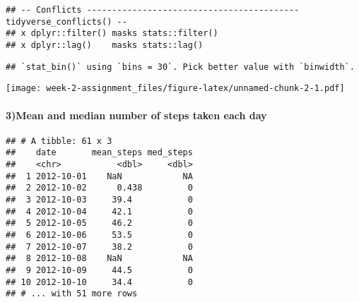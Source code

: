\documentclass[]{article}
\newenvironment{Shaded}{\begin{snugshade}}{\end{snugshade}}
\newcommand{\KeywordTok}[1]{\textcolor[rgb]{0.13,0.29,0.53}{\textbf{#1}}}
\newcommand{\DataTypeTok}[1]{\textcolor[rgb]{0.13,0.29,0.53}{#1}}
\newcommand{\StringTok}[1]{\textcolor[rgb]{0.31,0.60,0.02}{#1}}
\newcommand{\OtherTok}[1]{\textcolor[rgb]{0.56,0.35,0.01}{#1}}
\newcommand{\OperatorTok}[1]{\textcolor[rgb]{0.81,0.36,0.00}{\textbf{#1}}}
\newcommand{\NormalTok}[1]{#1}
\let\oldparagraph\paragraph
\renewcommand{\paragraph}[1]{\oldparagraph{#1}\mbox{}}
\begin{document}
\begin{verbatim}
## -- Conflicts ------------------------------------------ tidyverse_conflicts() --
## x dplyr::filter() masks stats::filter()
## x dplyr::lag()    masks stats::lag()
\end{verbatim}

\begin{Shaded}
\end{Shaded}

\begin{verbatim}
## `stat_bin()` using `bins = 30`. Pick better value with `binwidth`.
\end{verbatim}

\texttt{[image: week-2-assignment\_files/figure-latex/unnamed-chunk-2-1.pdf]}

\paragraph{3)Mean and median number of steps taken each
day}\label{mean-and-median-number-of-steps-taken-each-day}

\begin{Shaded}
\end{Shaded}

\begin{verbatim}
## # A tibble: 61 x 3
##    date       mean_steps med_steps
##    <chr>           <dbl>     <dbl>
##  1 2012-10-01    NaN            NA
##  2 2012-10-02      0.438         0
##  3 2012-10-03     39.4           0
##  4 2012-10-04     42.1           0
##  5 2012-10-05     46.2           0
##  6 2012-10-06     53.5           0
##  7 2012-10-07     38.2           0
##  8 2012-10-08    NaN            NA
##  9 2012-10-09     44.5           0
## 10 2012-10-10     34.4           0
## # ... with 51 more rows
\end{verbatim}
\end{document}
